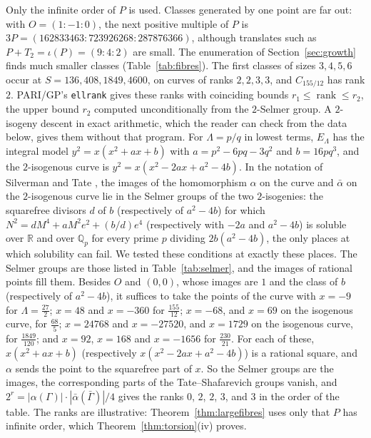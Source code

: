 \documentclass[11pt]{amsart}
\theoremstyle{definition}
\theoremstyle{remark}
\newcommand{\Q}{\mathbb{Q}}
\newcommand{\R}{\mathbb{R}}
\begin{document}
Only the infinite order of $P$ is used. Classes generated by one point are far out: with $O=(1:-1:0)$, the next positive multiple of $P$ is $3P=(162833463:723926268:287876366)$, although translates such as $P+T_2=\iota(P)=(9:4:2)$ are small. The enumeration of Section~\ref{sec:growth} finds much smaller classes (Table~\ref{tab:fibres}). The first classes of sizes $3,4,5,6$ occur at $S=136,408,1849,4600$, on curves of ranks $2,2,3,3$, and $C_{155/12}$ has rank $2$. PARI/GP's \texttt{ellrank} \cite{pari2172} gives these ranks with coinciding bounds $r_1\le\operatorname{rank}\le r_2$, the upper bound $r_2$ computed unconditionally from the $2$-Selmer group. A $2$-isogeny descent in exact arithmetic, which the reader can check from the data below, gives them without that program. For $\Lambda=p/q$ in lowest terms, $E_\Lambda$ has the integral model $y^2=x(x^2+ax+b)$ with $a=p^2-6pq-3q^2$ and $b=16pq^3$, and the $2$-isogenous curve is $y^2=x(x^2-2ax+a^2-4b)$. In the notation of Silverman and Tate \cite[Chap.~III, \S6]{silvermantate2015}, the images of the homomorphism $\alpha$ on the curve and $\bar\alpha$ on the $2$-isogenous curve lie in the Selmer groups of the two $2$-isogenies: the squarefree divisors $d$ of $b$ (respectively of $a^2-4b$) for which $N^2=dM^4+aM^2e^2+(b/d)e^4$ (respectively with $-2a$ and $a^2-4b$) is soluble over $\R$ and over $\Q_p$ for every prime $p$ dividing $2b(a^2-4b)$, the only places at which solubility can fail. We tested these conditions at exactly these places. The Selmer groups are those listed in Table~\ref{tab:selmer}, and the images of rational points fill them. Besides $O$ and $(0,0)$, whose images are $1$ and the class of $b$ (respectively of $a^2-4b$), it suffices to take the points of the curve with $x=-9$ for $\Lambda=\frac{27}2$; $x=48$ and $x=-360$ for $\frac{155}{12}$; $x=-68$, and $x=69$ on the isogenous curve, for $\frac{68}5$; $x=24768$ and $x=-27520$, and $x=1729$ on the isogenous curve, for $\frac{1849}{120}$; and $x=92$, $x=168$ and $x=-1656$ for $\frac{230}{21}$. For each of these, $x(x^2+ax+b)$ (respectively $x(x^2-2ax+a^2-4b)$) is a rational square, and $\alpha$ sends the point to the squarefree part of $x$. So the Selmer groups are the images, the corresponding parts of the Tate--Shafarevich groups vanish, and $2^r=|\alpha(\Gamma)|\cdot|\bar\alpha(\bar\Gamma)|/4$ gives the ranks $0$, $2$, $2$, $3$, and $3$ in the order of the table. The ranks are illustrative: Theorem~\ref{thm:largefibres} uses only that $P$ has infinite order, which Theorem~\ref{thm:torsion}(iv) proves.
\end{document}
